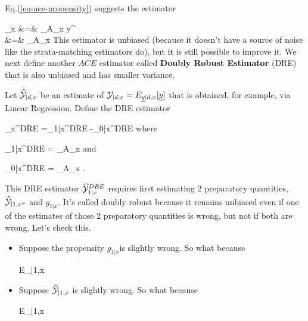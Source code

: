 Eq.(\ref{eq-ace-propensity})
 suggests the estimator 

\beqa
{}_x
&=&
\sum_{\s\in A_x}
y^\s
{}
\\
&=&
\sum_{\s \in A_x}
\label{eq-ace-esti-posi}
\eeqa
This 
estimator is unbiased
(because it doesn't
have a source
of noise like the
strata-matching
estimators do),
but it is still possible to
improve it.
We next 
define
another $ACE$ estimator
called
{\bf Doubly Robust Estimator} (DRE)
that is also 
unbiased and has smaller
variance.

Let
$\widehat{{\cal Y}}_{|d, x}$
be an estimate
of ${\cal Y}_{|d, x}
=E_{{\underline{y}}|d,x}[{\underline{y}}]$
that is 
obtained, for
example, via Linear Regression.
Define the DRE estimator

\beq
{}_x^{DRE}
=\widehat{\caly}_{1|x}^{DRE}
-\widehat{\caly}_{0|x}^{DRE}
\eeq
where 

\beq
\widehat{\caly}_{1|x}^{DRE}
=
\sum_{\s\in A_x}
\eeq
and

\beq
\widehat{\caly}_{0|x}^{DRE}
=
\sum_{\s\in A_x}
\;.
\eeq

This DRE estimator
$\widehat{{\cal Y}}_{1|x}^{DRE}$ 
requires first
estimating
2 preparatory quantities,
 $\widehat{{\cal Y}}_{|1, x^\sigma}$
and $g_{1|x}$.
It's 
called doubly robust
because it 
remains unbiased
even if one
of the
estimates 
of those 2 
preparatory quantities is wrong, 
but not if
both are wrong.
Let's check this.

\begin{itemize}
\item Suppose the propensity
$g_{1|x}$is slightly wrong.
So what because


\beq
E_{\s|1,x}
\eeq

\item Suppose 
$\widehat{{\cal Y}}_{|1, x}$ is 
slightly wrong. So what because

\beq
E_{\s|1,x}
\eeq

\end{itemize}

